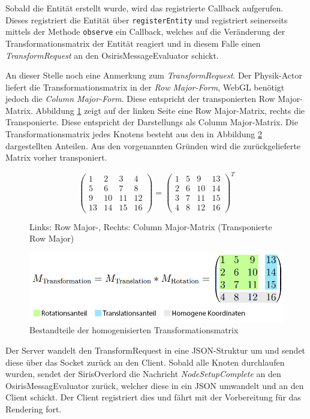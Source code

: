 Sobald die Entität erstellt wurde, wird das registrierte Callback aufgerufen. Dieses registriert die Entität über \texttt{registerEntity} und registriert seinerseits mittels der Methode \texttt{observe} ein Callback, welches auf die Veränderung der Transformationsmatrix der Entität reagiert und in diesem Falle einen \textit{TransformRequest} an den OsirisMessageEvaluator schickt.

An dieser Stelle noch eine Anmerkung zum \textit{TransformRequest}. Der Physik-Actor liefert die Transformationsmatrix in der \textit{Row Major-Form}, WebGL benötigt jedoch die \textit{Column Major-Form}. Diese entspricht der transponierten Row Major-Matrix. Abbildung \ref{fig:rowcolumn} zeigt auf der linken Seite eine Row Major-Matrix, rechts die Transponierte. Diese entspricht der Darstellungs als Column Major-Matrix. Die Transformationsmatrix jedes Knotens besteht aus den in Abbildung \ref{fig:transformationsmatrix} dargestellten Anteilen. Aus den vorgenannten Gründen wird die zurückgelieferte Matrix vorher transponiert.
\begin{figure}
\centering
\[
\begin{pmatrix}
1 & 2 & 3 & 4\\
5 & 6 & 7 & 8\\
9 & 10 & 11 & 12\\
13 & 14 & 15 & 16
\end{pmatrix}
=
\begin{pmatrix}
1 & 5 & 9 & 13\\
2 & 6 & 10 & 14\\
3 & 7 & 11 & 15\\
4 & 8 & 12 & 16
\end{pmatrix}^T
\]
\caption{Links: Row Major-, Rechts: Column Major-Matrix (Transponierte Row Major)}
\label{fig:rowcolumn}
\end{figure}
\begin{figure}
\centering
\includegraphics[width=120mm]{bilder/transformationsmatrix.png}
\caption{Bestandteile der homogenisierten Transformationsmatrix}
\label{fig:transformationsmatrix}
\end{figure}

Der Server wandelt den TransformRequest in eine JSON-Struktur um und sendet diese über das Socket zurück an den Client. Sobald alle Knoten durchlaufen wurden, sendet der SirisOverlord die Nachricht \textit{NodeSetupComplete} an den OsirisMessagEvaluator zurück, welcher diese in ein JSON umwandelt und an den Client schickt. Der Client registriert dies und fährt mit der Vorbereitung für das Rendering fort.

